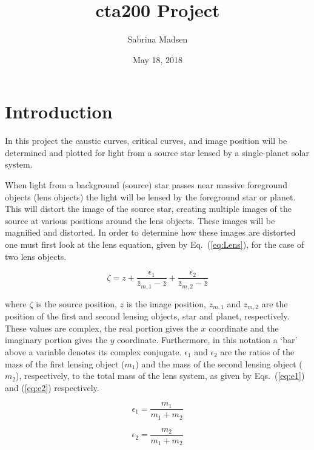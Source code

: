 \documentclass{article}
\begin{document}
\title{cta200 Project}
\author{Sabrina Madsen}
\date{May 18, 2018}
\maketitle


\section{Introduction}

In this project the caustic curves, critical curves, and image position will be determined and plotted for light from a source star lensed by a single-planet solar system.

When light from a background (source) star passes near massive foreground objects (lens objects) the light will be lensed by the foreground star or planet. This will distort the image of the source star, creating multiple images of the source at various positions around the lens objects. These images will be magnified and distorted. In order to determine how these images are distorted one must first look at the lens equation, given by Eq.~(\ref{eq:Lens}), for the case of two lens objects.

\begin{equation}
\zeta = z + \frac{\epsilon_1}{\bar{z}_{m,1}-\bar{z}}+ \frac{\epsilon_2}{\bar{z}_{m,2}-\bar{z}}
\label{eq:Lens}
\end{equation}

\noindent where $\zeta$ is the source position, $z$ is the image position, $z_{m,1}$ and $z_{m,2}$ are the position of the first and second lensing objects, star and planet, respectively. These values are complex, the real portion gives the $x$ coordinate and the imaginary portion gives the $y$ coordinate. Furthermore, in this notation a `bar' above a variable denotes its complex conjugate. $\epsilon_1$ and $\epsilon_2$ are the ratios of the mass of the first lensing object ($m_1$) and the mass of the second lensing object ($m_2$), respectively, to the total mass of the lens system, as given by Eqs.~(\ref{eq:e1}) and (\ref{eq:e2}) respectively.

\begin{minipage}[c]{0.45\textwidth}
\begin{equation}
\epsilon_1=\frac{m_1}{m_1+m_2}
\label{eq:e1}
\end{equation}
\end{minipage}
\begin{minipage}[c]{0.5\textwidth}
\begin{equation}
\epsilon_2= \frac{m_2}{m_1+m_2}
\label{eq:e2}
\end{equation}
\end{minipage}
\end{document}
